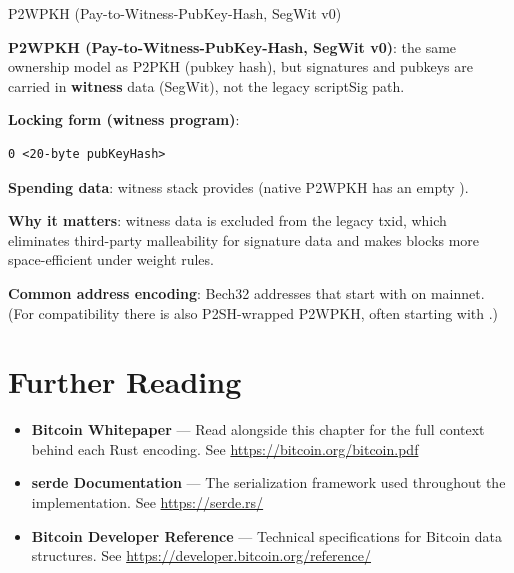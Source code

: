 \begin{deepdive}{P2WPKH (Pay-to-Witness-PubKey-Hash, SegWit v0)}

\textbf{P2WPKH (Pay-to-Witness-PubKey-Hash, SegWit v0)}: the same ownership model as P2PKH (pubkey hash), but signatures and pubkeys are carried in \textbf{witness} data (SegWit), not the legacy scriptSig path.

\textbf{Locking form (witness program)}:
\begin{verbatim}
0 <20-byte pubKeyHash>
\end{verbatim}

\textbf{Spending data}: witness stack provides  (native P2WPKH has an empty ).

\textbf{Why it matters}: witness data is excluded from the legacy txid, which eliminates third-party malleability for signature data and makes blocks more space-efficient under weight rules.

\textbf{Common address encoding}: Bech32 addresses that start with  on mainnet. (For compatibility there is also P2SH-wrapped P2WPKH, often starting with .)

\end{deepdive}

\section{Further Reading}
\label{sec:ch04-further-reading}

\begin{itemize}
  \item \textbf{Bitcoin Whitepaper} --- Read alongside this chapter for the full context behind each Rust encoding. See \url{https://bitcoin.org/bitcoin.pdf}
  \item \textbf{serde Documentation} --- The serialization framework used throughout the implementation. See \url{https://serde.rs/}
  \item \textbf{Bitcoin Developer Reference} --- Technical specifications for Bitcoin data structures. See \url{https://developer.bitcoin.org/reference/}
\end{itemize}

